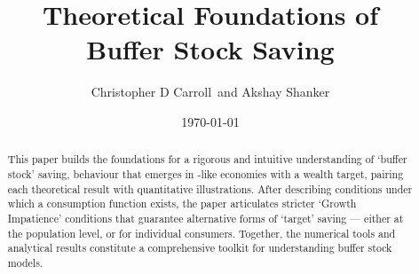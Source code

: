\documentclass[BufferStockTheory]{subfiles}
\begin{document}



\title{Theoretical Foundations of \\ Buffer Stock Saving}

\author{Christopher D Carroll\authNum ~and Akshay Shanker\authNum}



\date{\today}

\maketitle
\hypertarget{abstract}{}
\begin{abstract}
  This paper builds the foundations for a rigorous and intuitive understanding of `buffer stock' saving, behaviour that emerges in \cite{bewleyPIH}-like economies with a wealth target, pairing each theoretical result with quantitative illustrations.  After describing conditions under which a consumption function exists, the paper articulates stricter `Growth Impatience' conditions that guarantee alternative forms of `target' saving --- either at the population level, or for individual consumers.  Together, the numerical tools and analytical results constitute a comprehensive toolkit for understanding buffer stock models.
\end{abstract}

\hypertarget{links}{}
\end{document}
